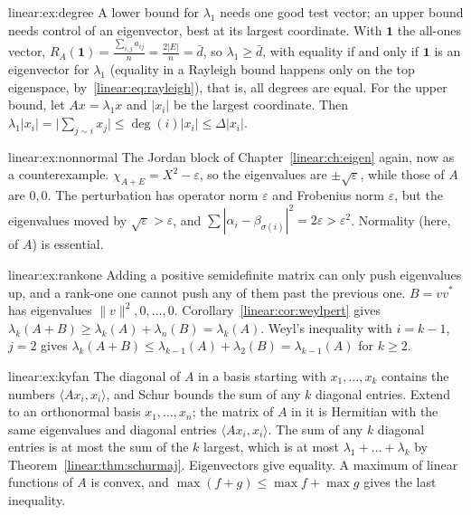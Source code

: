 \begin{solution}{linear:ex:degree}
\idea A lower bound for $\lambda_1$ needs one good test vector; an upper bound needs control of an eigenvector, best at its
largest coordinate.
\writeup With $\mathbf 1$ the all-ones vector, $R_A(\mathbf 1)=\frac{\sum_{i,j}a_{ij}}n=\frac{2|E|}n=\bar d$, so
$\lambda_1\ge\bar d$, with equality if and only if $\mathbf 1$ is an eigenvector for $\lambda_1$ (equality in a Rayleigh
bound happens only on the top eigenspace, by~\eqref{linear:eq:rayleigh}), that is, all degrees are equal. For the upper bound, let
$Ax=\lambda_1x$ and $|x_i|$ be the largest coordinate. Then $\lambda_1|x_i|=\bigl|\sum_{j\sim i}x_j\bigr|\le\deg(i)|x_i|\le
\Delta|x_i|$.
\end{solution}

\begin{solution}{linear:ex:nonnormal}
\idea The Jordan block of Chapter~\ref{linear:ch:eigen} again, now as a counterexample.
\writeup $\chi_{A+E}=X^2-\varepsilon$, so the eigenvalues are $\pm\sqrt\varepsilon$, while those of $A$ are $0,0$. The
perturbation has operator norm $\varepsilon$ and Frobenius norm $\varepsilon$, but the eigenvalues moved by $\sqrt\varepsilon>
\varepsilon$, and $\sum|\alpha_i-\beta_{\sigma(i)}|^2=2\varepsilon>\varepsilon^2$. Normality (here, of $A$) is essential.
\end{solution}

\begin{solution}{linear:ex:rankone}
\idea Adding a positive semidefinite matrix can only push eigenvalues up, and a rank-one one cannot push any of them past
the previous one.
\writeup $B=vv^*$ has eigenvalues $\|v\|^2,0,\dots,0$. Corollary~\ref{linear:cor:weylpert} gives $\lambda_k(A+B)\ge\lambda_k(A)+
\lambda_n(B)=\lambda_k(A)$. Weyl's inequality with $i=k-1$, $j=2$ gives $\lambda_k(A+B)\le\lambda_{k-1}(A)+\lambda_2(B)=
\lambda_{k-1}(A)$ for $k\ge2$.
\end{solution}

\begin{solution}{linear:ex:kyfan}
\idea The diagonal of $A$ in a basis starting with $x_1,\dots,x_k$ contains the numbers $\langle Ax_i,x_i\rangle$, and Schur
bounds the sum of any $k$ diagonal entries.
\writeup Extend to an orthonormal basis $x_1,\dots,x_n$; the matrix of $A$ in it is Hermitian with the same eigenvalues and
diagonal entries $\langle Ax_i,x_i\rangle$. The sum of any $k$ diagonal entries is at most the sum of the $k$ largest, which
is at most $\lambda_1+\dots+\lambda_k$ by Theorem~\ref{linear:thm:schurmaj}. Eigenvectors give equality. A maximum of linear
functions of $A$ is convex, and $\max(f+g)\le\max f+\max g$ gives the last inequality.
\end{solution}

